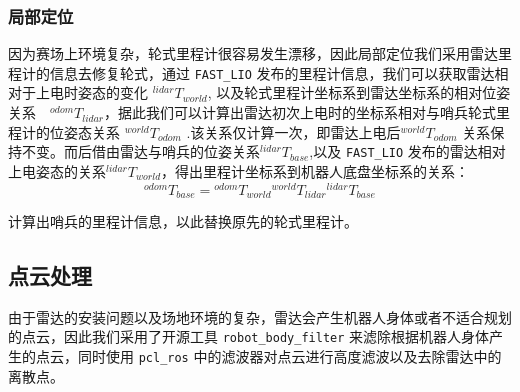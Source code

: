 \subsubsection{局部定位}
因为赛场上环境复杂，轮式里程计很容易发生漂移，因此局部定位我们采用雷达里程计的信息去修复轮式，通过 \lstinline{FAST_LIO} 发布的里程计信息，我们可以获取雷达相对于上电时姿态的变化 ${}^{lidar}T_{world}$, 以及轮式里程计坐标系到雷达坐标系的相对位姿关系　${}^{odom}T_{lidar}$，据此我们可以计算出雷达初次上电时的坐标系相对与哨兵轮式里程计的位姿态关系 ${}^{world}T_{odom}$ .该关系仅计算一次，即雷达上电后${}^{world}T_{odom}$ 关系保持不变。而后借由雷达与哨兵的位姿关系${}^{lidar}T_{base}$,以及 \lstinline{FAST_LIO} 发布的雷达相对上电姿态的关系${}^{lidar}T_{world}$，得出里程计坐标系到机器人底盘坐标系的关系：
\begin{equation}
    {}^{odom}T_{base} = {}^{odom}T_{world}  {}^{world}T_{lidar} {}^{lidar}T_{base} 
\end{equation}

计算出哨兵的里程计信息，以此替换原先的轮式里程计。

\subsection{点云处理}
由于雷达的安装问题以及场地环境的复杂，雷达会产生机器人身体或者不适合规划的点云，因此我们采用了开源工具 \lstinline{robot_body_filter} 来滤除根据机器人身体产生的点云，同时使用 \lstinline{pcl_ros} 中的滤波器对点云进行高度滤波以及去除雷达中的离散点。
